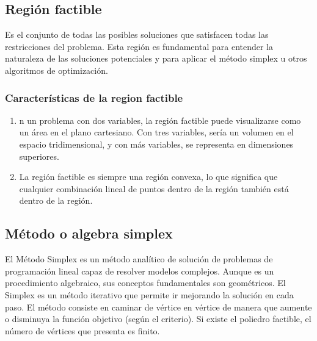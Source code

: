 \documentclass[conference]{IEEEtran}
\begin{document}
\subsection{Región factible}

Es el conjunto de todas las posibles soluciones que satisfacen todas las
restricciones del problema. Esta región es fundamental para entender la
naturaleza de las soluciones potenciales y para aplicar el método simplex
u otros algoritmos de optimización.

\subsubsection*{Características de la region factible}

\begin{enumerate}
    \item n un problema con dos variables, la región factible puede
          visualizarse como un área en el plano cartesiano. Con tres variables,
          sería un volumen en el espacio tridimensional, y con más variables, se
          representa en dimensiones superiores.

    \item La región factible es siempre una región convexa, lo que significa
          que cualquier combinación lineal de puntos dentro de la región también
          está dentro de la región.
\end{enumerate}


\subsection{Método o algebra simplex}

El Método Simplex es un método analítico de solución de problemas de
programación lineal capaz de resolver modelos complejos. Aunque es un
procedimiento algebraico, sus conceptos fundamentales son geométricos.
El Simplex es un método iterativo que permite ir mejorando la solución en
cada paso. El método consiste en caminar de vértice en vértice de manera que
aumente o disminuya la función objetivo (según el criterio). Si existe el
poliedro factible, el número de vértices que presenta es finito.
\end{document}
